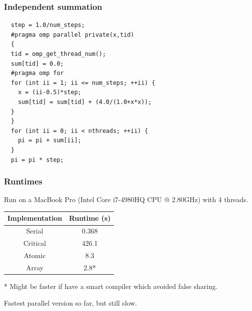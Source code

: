 \documentclass{beamer}
\begin{document}
\begin{frame}[fragile]
\frametitle{Independent summation}
\begin{verbatim}
  step = 1.0/num_steps;
  #pragma omp parallel private(x,tid)
  {
  tid = omp_get_thread_num();
  sum[tid] = 0.0;
  #pragma omp for
  for (int ii = 1; ii <= num_steps; ++ii) {
    x = (ii-0.5)*step;
    sum[tid] = sum[tid] + (4.0/(1.0+x*x));
  }
  }
  for (int ii = 0; ii < nthreads; ++ii) {
    pi = pi + sum[ii];
  }
  pi = pi * step;
\end{verbatim}
\end{frame}

\begin{frame}
\frametitle{Runtimes}
Run on a MacBook Pro (Intel Core i7-4980HQ CPU @ 2.80GHz) with 4 threads.

\vfill

\begin{table}
\begin{tabular}{cc}
\toprule
Implementation & Runtime (s) \\
\midrule
Serial   & 0.368 \\
Critical & 426.1 \\
Atomic   & 8.3 \\
Array    & 2.8* \\
\bottomrule
\end{tabular}
\end{table}

* Might be faster if have a smart compiler which avoided false sharing.

\begin{center}
\large Fastest parallel version so far, but still slow.
\end{center}

\end{frame}

\end{document}
